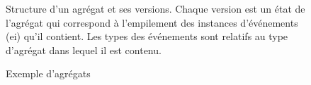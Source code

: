 \begin{figure}
	\centering
	\caption{Exemple d'agrégats}{Structure d'un agrégat et ses versions. Chaque 
		version est un état de l'agrégat qui correspond à l'empilement des instances 
		d'événements (ei) qu'il contient. Les types des événements sont relatifs au 
		type 
		d'agrégat dans lequel il est contenu.}
	\label{fig:aggregate}
\end{figure}